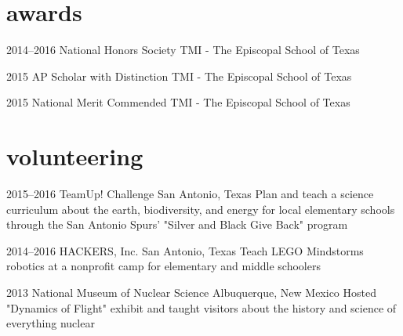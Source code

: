 \documentclass[]{friggeri-cv} %
\begin{document}
\vspace{-.5pt}

\section{awards}

\begin{entrylist}

	\vspace{-10pt}
	\entry
	{2014--2016}
	{National Honors Society}
	{TMI - The Episcopal School of Texas}


	\vspace{-10pt}
	\entry
	{2015}
	{AP Scholar with Distinction}
	{TMI - The Episcopal School of Texas}


	\vspace{-10pt}
	\entry
	{2015}
	{National Merit Commended}
	{TMI - The Episcopal School of Texas}

\end{entrylist}

\vspace{-.5pt}


\section{volunteering}

\begin{entrylist}

	\entry
	{2015--2016}
	{TeamUp! Challenge}
	{San Antonio, Texas}
	{Plan and teach a science curriculum about the earth, biodiversity, and energy for local elementary schools through the San Antonio Spurs' "Silver and Black Give Back" program}


	\entry
	{2014--2016}
	{HACKERS, Inc.}
	{San Antonio, Texas}
	{Teach LEGO Mindstorms robotics at a nonprofit camp for elementary and middle schoolers}


	\entry
	{2013}
	{National Museum of Nuclear Science}
	{Albuquerque, New Mexico}
	{Hosted "Dynamics of Flight" exhibit and taught visitors about the history and science of everything nuclear}

\end{entrylist}
\end{document}
